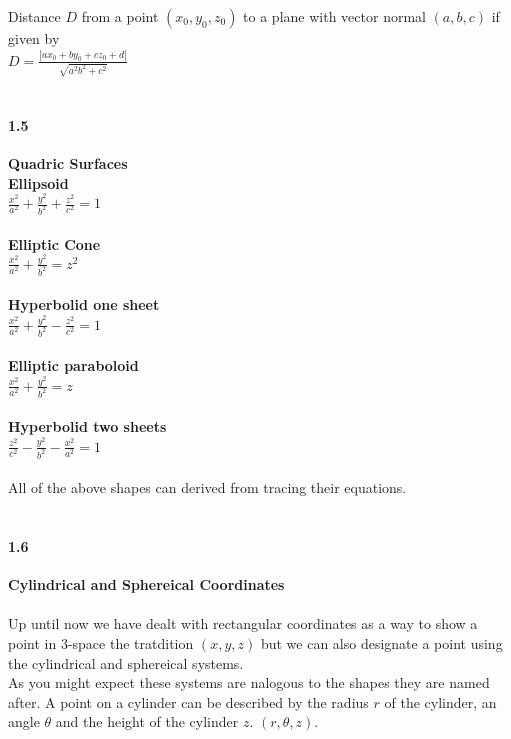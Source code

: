 \documentclass[14pt]{extreport}
\begin{document}
Distance $D$ from a point $(x_0, y_0, z_0)$ to a plane with vector normal $(a, b, c)$ if given by\\

$D = \frac{|ax_0 + by_0 + cz_0 + d|}{\sqrt{a^2 b^2 +c^2}}$\\\\

\paragraph{1.5}\textbf{Quadric Surfaces}\\

\textbf{Ellipsoid}\\
$\frac{x^2}{a^2} + \frac{y^2}{b^2} + \frac{z^2}{c^2} = 1$\\\\
\textbf{Elliptic Cone}\\
$\frac{x^2}{a^2} + \frac{y^2}{b^2} =z^2$\\\\
\textbf{Hyperbolid one sheet}\\
$\frac{x^2}{a^2} + \frac{y^2}{b^2} - \frac{z^2}{c^2} = 1$\\\\
\textbf{Elliptic paraboloid}\\
$\frac{x^2}{a^2} + \frac{y^2}{b^2}=z$\\\\
\textbf{Hyperbolid two sheets}\\
$\frac{z^2}{c^2} - \frac{y^2}{b^2} - \frac{x^2}{a^2} = 1$\\\\

All of the above shapes can derived from tracing their equations. \\\\

\paragraph{1.6}\textbf{Cylindrical and Sphereical Coordinates}\\\\

Up until now we have dealt with rectangular coordinates as a way to show a point in 3-space the tratdition $(x, y, z)$ but we can also designate a point using the cylindrical and sphereical systems.\\

As you might expect these systems are nalogous to the shapes they are named after. A point on a cylinder can be described by the radius $r$ of the cylinder, an angle $\theta$ and the height of the cylinder $z$. $(r, \theta, z)$.\\
\end{document}
